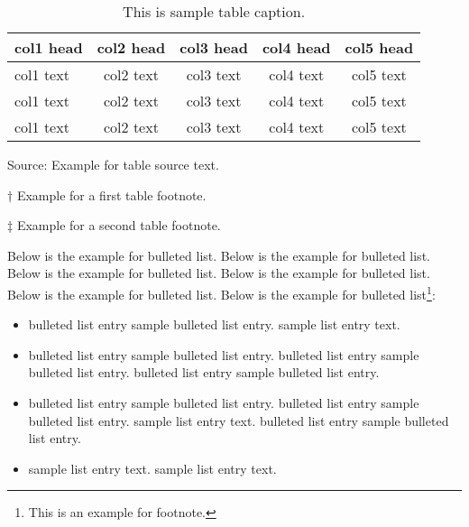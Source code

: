 \documentclass[AMA]{WileyNJD-v1}
\begin{document}
\begin{center}
\begin{table}[t]%
\centering
\caption{This is sample table caption.\label{tab2}}%
\begin{tabular*}{500pt}{@{\extracolsep\fill}lcccc@{\extracolsep\fill}}
\toprule
\textbf{col1 head} & \textbf{col2 head}  & \textbf{col3 head}  & \textbf{col4 head}  & \textbf{col5 head} \\
\midrule
col1 text & col2 text  & col3 text  & col4 text  & col5 text\tnote{$\dagger$}   \\
col1 text & col2 text  & col3 text  & col4 text  & col5 text   \\
col1 text & col2 text  & col3 text  & col4 text  & col5 text\tnote{$\ddagger$}   \\
\bottomrule
\end{tabular*}
\begin{tablenotes}
\item Source: Example for table source text.
\item[$\dagger$] Example for a first table footnote.
\item[$\ddagger$] Example for a second table footnote.
\end{tablenotes}
\end{table}
\end{center}



Below is the example\cites{Liska_etal-Synchronized_FCT-JCP-10,Kucharik-Shashkov-Wendroff-JCP-paper-03,Blanchard-Loubere-MOOD_remap-techrep-15} for bulleted list. Below is the example for bulleted list. Below is the example for bulleted list. Below is the example for bulleted list. Below is the example for bulleted list. Below is the example for bulleted list\footnote{This is an example for footnote.}:
\begin{itemize}
\item bulleted list entry sample bulleted list entry.\cite{Lauritzen_Erath_Mittal-swept_exact_error_analysis-JCP-11} sample list entry text. 
\item bulleted list entry sample bulleted list entry. bulleted list entry sample bulleted list entry. bulleted list entry sample bulleted list entry.
\item bulleted list entry sample bulleted list entry.\cite{Klima-Kucharik-analysis} bulleted list entry sample bulleted list entry.\cite{Dukowicz_Baumgardner-advection-JCP-00} sample list entry text.  bulleted list entry sample bulleted list entry.
\item sample list entry text. sample list entry text.  
\end{itemize}
\end{document}

